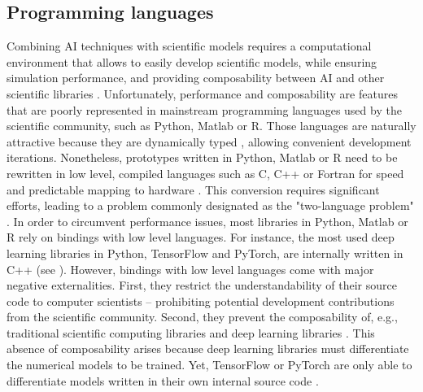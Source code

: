 

\subsection{Programming languages}

Combining AI techniques with scientific models requires a computational environment that allows to easily develop scientific models, while ensuring simulation performance, and providing composability between AI and other scientific libraries \citep{Rackauckas2020}. Unfortunately, performance and composability are features that are poorly represented in mainstream programming languages used by the scientific community, such as Python, Matlab or R.
% 
Those languages are naturally attractive because they are dynamically typed \citep{Bezanson2017}, allowing convenient development iterations. Nonetheless, prototypes written in Python, Matlab or R need to be rewritten in low level, compiled languages such as C, C++ or Fortran for speed and predictable mapping to hardware \citep{Perkel2019,Bezanson2017}. This conversion requires significant efforts, leading to a problem commonly designated as the "two-language problem" \citep{Bezanson2017}.
% 
In order to circumvent performance issues, most libraries in Python, Matlab or R rely on bindings with low level languages. For instance, the most used deep learning libraries in Python, TensorFlow and PyTorch, are internally written in C++ (see \cite{https://github.com/tensorflow/tensorflow,https://github.com/pytorch/pytorch}). However, bindings with low level languages come with major negative externalities. First, they restrict the understandability of their source code to computer scientists -- prohibiting potential development contributions from the scientific community. Second, they prevent the composability of, e.g., traditional scientific computing libraries and deep learning libraries \citep{Innes2019}. This absence of composability arises because deep learning libraries must differentiate the numerical models to be trained. Yet, TensorFlow or PyTorch are only able to differentiate models written in their own internal source code \citep{Innes2019}.

